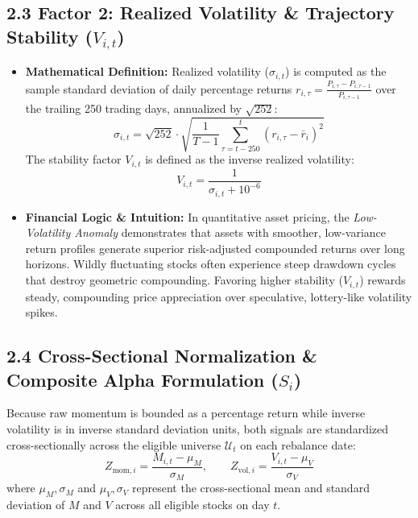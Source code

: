 \documentclass[11pt,a4paper]{article}
\begin{document}
\subsection{2.3 Factor 2: Realized Volatility \& Trajectory Stability ($V_{i,t}$)}
\begin{itemize}[leftmargin=1.5em]
    \item \textbf{Mathematical Definition:} Realized volatility ($\sigma_{i,t}$) is computed as the sample standard deviation of daily percentage returns $r_{i,\tau} = \frac{P_{i,\tau} - P_{i,\tau-1}}{P_{i,\tau-1}}$ over the trailing 250 trading days, annualized by $\sqrt{252}$:
    \begin{equation}
        \sigma_{i, t} = \sqrt{252} \cdot \sqrt{\frac{1}{T-1}\sum_{\tau=t-250}^{t} (r_{i,\tau} - \bar{r}_i)^2}
    \end{equation}
    The stability factor $V_{i,t}$ is defined as the inverse realized volatility:
    \begin{equation}
        V_{i, t} = \frac{1}{\sigma_{i, t} + 10^{-6}}
    \end{equation}
    \item \textbf{Financial Logic \& Intuition:} In quantitative asset pricing, the \textit{Low-Volatility Anomaly} demonstrates that assets with smoother, low-variance return profiles generate superior risk-adjusted compounded returns over long horizons. Wildly fluctuating stocks often experience steep drawdown cycles that destroy geometric compounding. Favoring higher stability ($V_{i,t}$) rewards steady, compounding price appreciation over speculative, lottery-like volatility spikes.
\end{itemize}

\subsection{2.4 Cross-Sectional Normalization \& Composite Alpha Formulation ($S_i$)}
Because raw momentum is bounded as a percentage return while inverse volatility is in inverse standard deviation units, both signals are standardized cross-sectionally across the eligible universe $\mathcal{U}_t$ on each rebalance date:
\begin{equation}
    Z_{\text{mom}, i} = \frac{M_{i,t} - \mu_M}{\sigma_M}, \qquad Z_{\text{vol}, i} = \frac{V_{i,t} - \mu_V}{\sigma_V}
\end{equation}
where $\mu_M, \sigma_M$ and $\mu_V, \sigma_V$ represent the cross-sectional mean and standard deviation of $M$ and $V$ across all eligible stocks on day $t$.
\end{document}
